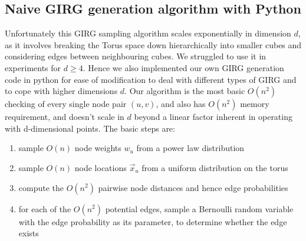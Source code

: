 \subsection{Naive GIRG generation algorithm with Python}
Unfortunately this GIRG sampling algorithm scales exponentially in dimension $d$, as it involves breaking the Torus space down hierarchically into smaller cubes and considering edges between neighbouring cubes. We struggled to use it in experiments for $d \geq 4$.
Hence we also implemented our own GIRG generation code in python for ease of modification to deal with different types of GIRG and to cope with higher dimensions $d$. 
Our algorithm is the most basic $O(n^2)$ checking of every single node pair $(u, v)$, and also has $O(n^2)$ memory requirement, and doesn't scale in $d$ beyond a linear factor inherent in operating with d-dimensional points. The basic steps are:
\begin{enumerate}
    \item sample $O(n)$ node weights $w_u$ from a power law distribution
    \item sample $O(n)$ node locations $\vec{x}_u$ from a uniform distribution on the torus
    \item compute the $O(n^2)$ pairwise node distances and hence edge probabilities
    \item for each of the $O(n^2)$ potential edges, sample a Bernoulli random variable with the edge probability as its parameter, to determine whether the edge exists
\end{enumerate}









